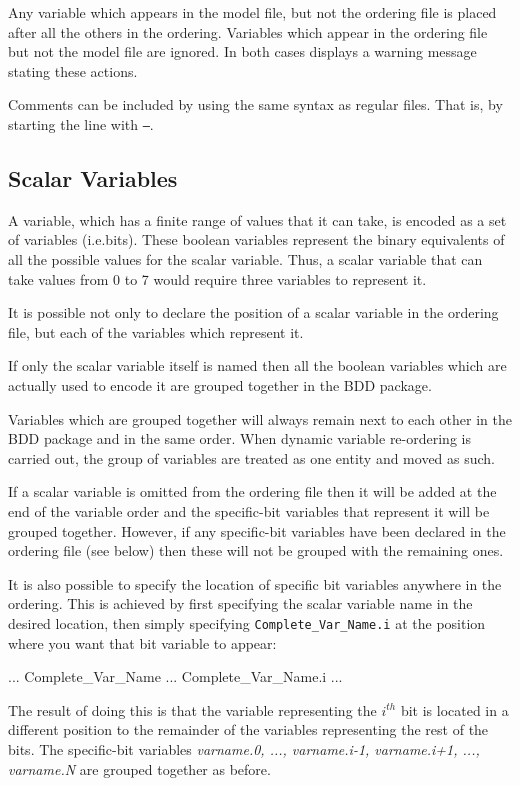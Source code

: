 \noindent Any variable which appears in the model file, but not the
ordering file is placed after all the others in the
ordering. Variables which appear in the ordering file but not the
model file are ignored. In both cases \nusmv displays a warning
message stating these actions.

Comments can be included by using the same syntax as regular \nusmv
files. That is, by starting the line with \texttt{--}.


\subsection{Scalar Variables}
\label{Scalar Variables}
%
A variable, which has a finite range of values that it can take, is
encoded as a set of \Boolean variables (i.e.\@ bits). These boolean variables
represent the binary equivalents of all the possible values for the
scalar variable. Thus, a scalar variable that can take values from 0
to 7 would require three \Boolean variables to represent it.

It is possible not only to declare the position of a scalar variable
in the ordering file, but each of the \Boolean variables which
represent it.

\noindent If only the scalar variable itself is named then all the
boolean variables which are actually used to encode it are grouped
together in the BDD package.

\noindent Variables which are grouped together will always remain next
to each other in the BDD package and in the same order. 
%
When dynamic variable re-ordering is carried out, the group of
variables are treated as one entity and moved as such.

\noindent If a scalar variable is omitted from the ordering file then
it will be added at the end of the variable order and the specific-bit
variables that represent it will be grouped together. 
%
However, if any specific-bit variables have been declared in the
ordering file (see below) then these will not be grouped with the
remaining ones.

\noindent It is also possible to specify the location of specific bit variables
anywhere in the ordering.
%
This is achieved by first specifying the scalar variable name in the
desired location, then simply specifying
\texttt{Complete\_Var\_Name.i} at the position where you want that bit
variable to appear:
%
\begin{Grammar}
...
Complete\_Var\_Name
...
Complete\_Var\_Name.i
...
\end{Grammar}
%
The result of doing this is that the variable representing the
\textit{$i^{th}$} bit is located in a different position to the
remainder of the variables representing the rest of the bits. 
%
The specific-bit variables \textit{varname.0, ..., varname.i-1,
varname.i+1, ..., varname.N} are grouped together as before.

